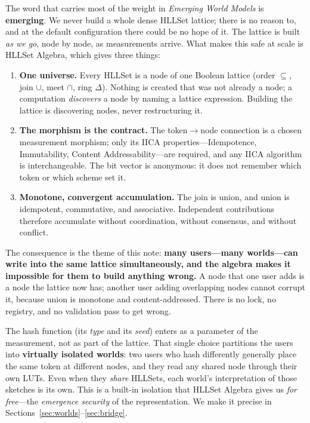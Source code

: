 \documentclass[11pt,a4paper]{article}
\theoremstyle{remark}
\begin{document}
The word that carries most of the weight in \emph{Emerging World Models} is
\textbf{emerging}. We never build a whole dense HLLSet lattice; there is no
reason to, and at the default configuration there could be no hope of it. The
lattice is built \emph{as we go}, node by node, as measurements arrive. What
makes this safe at scale is HLLSet Algebra, which gives three things:

\begin{enumerate}[leftmargin=*,nosep]
  \item \textbf{One universe.} Every HLLSet is a node of one Boolean lattice
    (order $\subseteq$, join $\cup$, meet $\cap$, ring $\Delta$). Nothing is
    created that was not already a node; a computation \emph{discovers} a node
    by naming a lattice expression. Building the lattice is discovering nodes,
    never restructuring it.
  \item \textbf{The morphism is the contract.} The token$\to$node connection is
    a chosen measurement morphism; only its IICA properties---Idempotence,
    Immutability, Content Addressability---are required, and any IICA algorithm
    is interchangeable. The bit vector is anonymous: it does not remember which
    token or which scheme set it.
  \item \textbf{Monotone, convergent accumulation.} The join is union, and union
    is idempotent, commutative, and associative. Independent contributions
    therefore accumulate without coordination, without consensus, and without
    conflict.
\end{enumerate}

The consequence is the theme of this note: \textbf{many users---many
worlds---can write into the same lattice simultaneously, and the algebra makes
it impossible for them to build anything wrong.} A node that one user adds is a
node the lattice now has; another user adding overlapping nodes cannot corrupt
it, because union is monotone and content-addressed. There is no lock, no
registry, and no validation pass to get wrong.

The hash function (its \emph{type} and its \emph{seed}) enters as a parameter of
the measurement, not as part of the lattice. That single choice partitions the
users into \textbf{virtually isolated worlds}: two users who hash differently
generally place the same token at different nodes, and they read any shared node
through their own LUTs. Even when they \emph{share} HLLSets, each world's
interpretation of those sketches is its own. This is a built-in isolation that
HLLSet Algebra gives us \emph{for free}---the \emph{emergence security} of the
representation. We make it precise in Sections~\ref{sec:worlds}--\ref{sec:bridge}.
\end{document}
